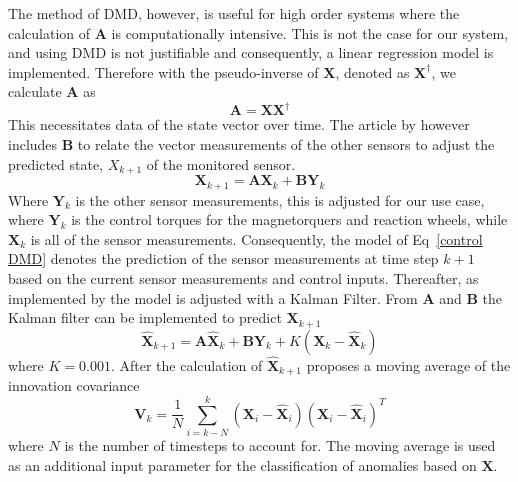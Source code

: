\documentclass[letterpaper, 10 pt, conference]{ieeeconf}  %
\begin{document}
The method of DMD, however, is useful for high order systems where the calculation of $\mathbf{A}$ is computationally intensive. This is not the case for our system, and using DMD is not justifiable and consequently, a linear regression model is implemented. Therefore with the pseudo-inverse of $\mathbf{X}$, denoted as $\mathbf{X^{\dagger}}$, we calculate $\mathbf{A}$ as
\begin{equation}
\mathbf{A} = \mathbf{X}\mathbf{X^{\dagger}}
\end{equation}
This necessitates data of the state vector over time. The article by \textcite{DeSilva2020} however includes $\mathbf{B}$ to relate the vector measurements of the other sensors to adjust the predicted state, $X_{k+1}$ of the monitored sensor. 
\begin{equation}
\mathbf{X}_{k+1} = \mathbf{AX}_k + \mathbf{BY}_k
\label{control DMD}
\end{equation}
Where $\mathbf{Y}_k$ is the other sensor measurements, this is adjusted for our use case, where $\mathbf{Y}_k$ is the control torques for the magnetorquers and reaction wheels, while $\mathbf{X}_k$ is all of the sensor measurements. Consequently, the model of Eq~\ref{control DMD} denotes the prediction of the sensor measurements at time step $k+1$ based on the current sensor measurements and control inputs.
Thereafter, as implemented by \textcite{DeSilva2020} the model is adjusted with a Kalman Filter. From $\mathbf{A}$ and $\mathbf{B}$ the Kalman filter can be implemented to predict $\mathbf{X}_{k+1}$
\begin{equation}
\hat{\mathbf{X}}_{k+1} = \mathbf{A}\hat{\mathbf{X}}_k + \mathbf{B}\mathbf{Y}_k + K(\mathbf{X}_k - \hat{\mathbf{X}}_k)
\end{equation}
where $K = 0.001$. After the calculation of $\hat{\mathbf{X}}_{k+1}$ \textcite{DeSilva2020} proposes a moving average of the innovation covariance
\begin{equation}
\mathbf{V}_k = \frac{1}{N} \sum_{i=k-N}^k (\mathbf{X}_i - \hat{\mathbf{X}}_i)(\mathbf{X}_i - \hat{\mathbf{X}}_i)^T
\end{equation}
where $N$ is the number of timesteps to account for. The moving average is used as an additional input parameter for the classification of anomalies based on $\mathbf{X}$.
\end{document}
